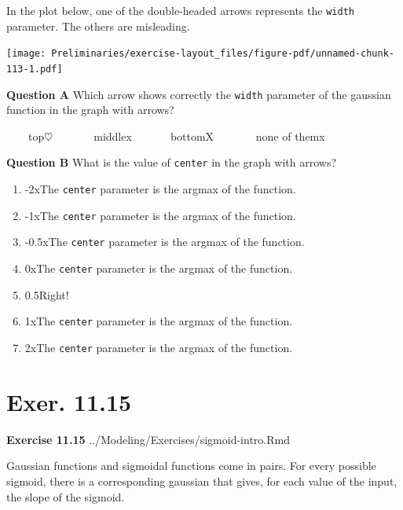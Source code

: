 \documentclass[
  letterpaper,
  DIV=11,
  numbers=noendperiod,
  oneside]{article}
\providecommand{\tightlist}{%
  \setlength{\itemsep}{0pt}\setlength{\parskip}{0pt}}\usepackage{longtable,booktabs,array}
\begin{document}
\begin{multicols}{2}
\begin{table}
\begin{minipage}[t]{\linewidth}
{}

\end{minipage}%

\end{table}

In the plot below, one of the double-headed arrows represents the
\texttt{width} parameter. The others are misleading.

\texttt{[image: Preliminaries/exercise-layout\_files/figure-pdf/unnamed-chunk-113-1.pdf]}

\textbf{Question A} Which arrow shows correctly the \texttt{width}
parameter of the gaussian function in the graph with arrows?

~~~~{top{\(\heartsuit\ \)}}~~~~~~~{middle{x}}~~~~~~~{bottom{︎X
}}~~~~~~~{none of them{x}}

\textbf{Question B} What is the value of \texttt{center} in the graph
with arrows?

\begin{enumerate}
\def\labelenumi{\roman{enumi}.}
\tightlist
\item
  {-2{xThe \texttt{center} parameter is the argmax of the
  function.}}\\
\item
  {-1{xThe \texttt{center} parameter is the argmax of the
  function.}}\\
\item
  {-0.5{xThe \texttt{center} parameter is the argmax of the
  function.}}\\
\item
  {0{xThe \texttt{center} parameter is the argmax of the function.}}\\
\item
  {0.5{Right!~}}\\
\item
  {1{xThe \texttt{center} parameter is the argmax of the function.}}\\
\item
  {2{xThe \texttt{center} parameter is the argmax of the function.}}
\end{enumerate}

\hypertarget{exer.-11.15}{%
\section*{Exer. 11.15}\label{exer.-11.15}}

\textbf{Exercise 11.15} ../Modeling/Exercises/sigmoid-intro.Rmd

Gaussian functions and sigmoidal functions come in pairs. For every
possible sigmoid, there is a corresponding gaussian that gives, for each
value of the input, the slope of the sigmoid.


\end{multicols}
\end{document}
